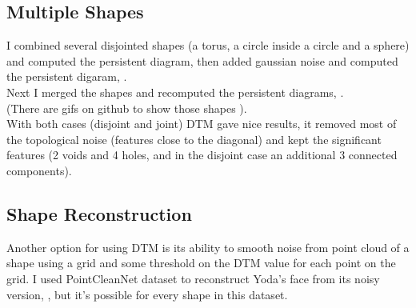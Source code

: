 \documentclass[11pt]{article}
\theoremstyle{definition}
\theoremstyle{definition}
\begin{document}
\subsection{Multiple Shapes}


I combined several disjointed shapes (a torus, a circle inside a circle and a sphere) and computed the persistent diagram, then added gaussian noise and computed the persistent digaram, .\\
Next I merged the shapes and recomputed the persistent diagrams, .\\
(There are gifs on github to show those shapes \cite{git}).\\
With both cases (disjoint and joint) DTM gave nice results, it removed most of the topological noise (features close to the diagonal) and kept the significant features (2 voids and 4 holes, and in the disjoint case an additional 3 connected components).


\subsection{Shape Reconstruction}


Another option for using DTM is its ability to smooth noise from point cloud of a shape using a grid and some threshold on the DTM value for each point on the grid. I used PointCleanNet dataset \cite{point} to reconstruct Yoda's face from its noisy version, , but it's possible for every shape in this dataset.
\end{document}
